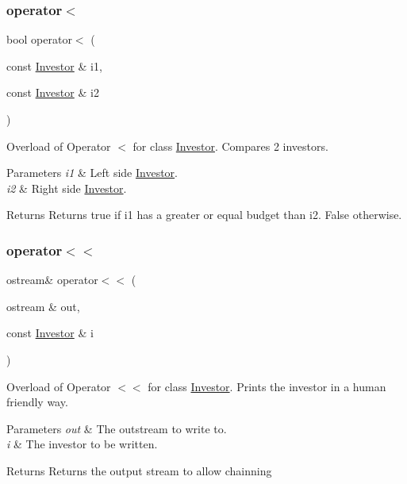 \subsubsection{\texorpdfstring{operator$<$}{operator<}}
{\footnotesize\ttfamily bool operator$<$ (\begin{DoxyParamCaption}\item[{const \hyperlink{class_investor}{Investor} \&}]{i1,  }\item[{const \hyperlink{class_investor}{Investor} \&}]{i2 }\end{DoxyParamCaption})\hspace{0.3cm}{\ttfamily [friend]}}

Overload of Operator $<$ for class \hyperlink{class_investor}{Investor}. Compares 2 investor\textquotesingle{}s. 
\begin{DoxyParams}{Parameters}
{\em i1} & Left side \hyperlink{class_investor}{Investor}. \\
\hline
{\em i2} & Right side \hyperlink{class_investor}{Investor}. \\
\hline
\end{DoxyParams}
\begin{DoxyReturn}{Returns}
Returns true if i1 has a greater or equal budget than i2. False otherwise. 
\end{DoxyReturn}
\mbox{\label{class_investor_a56d4a3414c2abc57af5ee9fac3435967}} 
\subsubsection{\texorpdfstring{operator$<$$<$}{operator<<}}
{\footnotesize\ttfamily ostream\& operator$<$$<$ (\begin{DoxyParamCaption}\item[{ostream \&}]{out,  }\item[{const \hyperlink{class_investor}{Investor} \&}]{i }\end{DoxyParamCaption})\hspace{0.3cm}{\ttfamily [friend]}}

Overload of Operator $<$$<$ for class \hyperlink{class_investor}{Investor}. Prints the investor in a human friendly way. 
\begin{DoxyParams}{Parameters}
{\em out} & The outstream to write to. \\
\hline
{\em i} & The investor to be written. \\
\hline
\end{DoxyParams}
\begin{DoxyReturn}{Returns}
Returns the output stream to allow chainning 
\end{DoxyReturn}
\mbox{\label{class_investor_abf836184e1217e7fadce67fea810819d}} 
